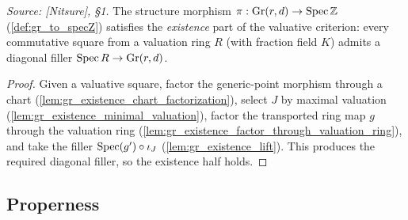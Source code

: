 \begin{lemma}\leanok
  \label{lem:gr_valuativeExistence_toSpecZ}
  \textit{Source: [Nitsure], \S 1.}
  The structure morphism \(\pi : \mathrm{Gr}(r,d) \to \operatorname{Spec} \mathbb{Z}\)
  (\cref{def:gr_to_specZ}) satisfies the \emph{existence} part of the valuative
  criterion: every commutative square from a valuation ring \(R\) (with fraction
  field \(K\)) admits a diagonal filler \(\operatorname{Spec} R \to \mathrm{Gr}(r,d)\).
\end{lemma}
\begin{proof}
    \leanok
  Given a valuative square, factor the generic-point morphism through a chart
  (\cref{lem:gr_existence_chart_factorization}), select \(J\) by maximal valuation
  (\cref{lem:gr_existence_minimal_valuation}), factor the transported ring map
  \(g\) through the valuation ring (\cref{lem:gr_existence_factor_through_valuation_ring}),
  and take the filler \(\operatorname{Spec}(g') \circ \iota_J\)
  (\cref{lem:gr_existence_lift}). This produces the required diagonal filler, so the
  existence half holds.
\end{proof}

\subsection*{Properness}


